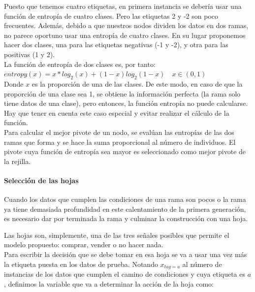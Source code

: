 Puesto que tenemos cuatro etiquetas, en primera instancia se deber\'ia usar una funci\'on de entrop\'ia de cuatro clases. Pero las etiquetas 2 y -2 son poco frecuentes. Adem\'as, debido a que nuestros nodos dividen los datos en dos ramas, no parece oportuno usar una entrop\'ia de cuatro clases. En su lugar proponemos hacer dos clases, una para las etiquetas negativas (-1 y -2), y otra para las positivas (1 y 2).\\

La funci\'on de entrop\'ia de dos clases es, por tanto:\\

$entropy(x) = x*log_{2}(x) + (1-x)log_{2}(1-x) \quad x\in(0,1)$\\

Donde $x$ es la proporci\'on de una de las clases. De este modo, en caso de que la proporci\'on de una clase sea 1, se obtiene la informaci\'on perfecta (la rama solo tiene datos de una clase), pero entonces, la funci\'on entrop\'ia no puede calcularse. Hay que tener en cuenta este caso especial  y evitar realizar el c\'alculo de la funci\'on.\\

Para calcular el mejor pivote de un nodo, se eval\'uan las entrop\'ias de las dos ramas que forma y se hace la suma proporcional al n\'umero de individuos. El pivote cuya funci\'on de entrop\'ia sea mayor es seleccionado como mejor pivote de la rejilla.

\paragraph{Selecci\'on de las hojas}
Cuando los datos que cumplen las condiciones de una rama son pocos o la rama ya tiene demasiada profundidad en este calentamiento de la primera generaci\'on, es necesario dar por terminada la rama y culminar la construcci\'on con una hoja.

Las hojas son, simplemente, una de las tres se\~nales posibles que permite el modelo propuesto: comprar, vender o no hacer nada.\\

Para escribir la decisi\'on que se debe tomar en esa hoja se va a usar una vez m\'as la etiqueta puesta en los datos de prueba. Notando $x_{tag=a}$ al n\'umero de instancias de los datos que cumplen el camino de condiciones y cuya etiqueta es $a$, definimos la variable que va a determinar la acci\'on de la hoja como:\\

